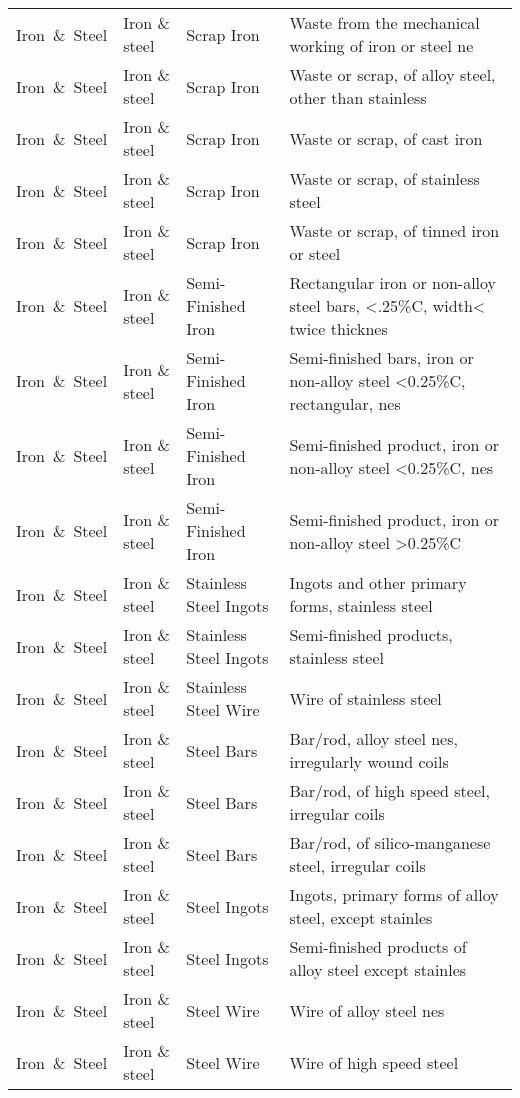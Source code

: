 \begin{appendices}
\begin{xltabular}{\textwidth}{|p{0.07\textwidth}|p{0.12\textwidth}|p{0.20\textwidth}|p{0.5\textwidth}|}
Iron\ \&\ Steel & Iron \& steel & Scrap Iron & Waste from the mechanical working of iron or steel ne \\
Iron\ \&\ Steel & Iron \& steel & Scrap Iron & Waste or scrap, of alloy steel, other than stainless \\
Iron\ \&\ Steel & Iron \& steel & Scrap Iron & Waste or scrap, of cast iron \\
Iron\ \&\ Steel & Iron \& steel & Scrap Iron & Waste or scrap, of stainless steel \\
Iron\ \&\ Steel & Iron \& steel & Scrap Iron & Waste or scrap, of tinned iron or steel \\
Iron\ \&\ Steel & Iron \& steel & Semi-Finished Iron & Rectangular iron or non-alloy steel bars, <.25\%C, width< twice thicknes \\
Iron\ \&\ Steel & Iron \& steel & Semi-Finished Iron & Semi-finished bars, iron or non-alloy steel <0.25\%C, rectangular, nes \\
Iron\ \&\ Steel & Iron \& steel & Semi-Finished Iron & Semi-finished product, iron or non-alloy steel <0.25\%C, nes \\
Iron\ \&\ Steel & Iron \& steel & Semi-Finished Iron & Semi-finished product, iron or non-alloy steel >0.25\%C \\
Iron\ \&\ Steel & Iron \& steel & Stainless Steel Ingots & Ingots and other primary forms, stainless steel \\
Iron\ \&\ Steel & Iron \& steel & Stainless Steel Ingots & Semi-finished products, stainless steel \\
Iron\ \&\ Steel & Iron \& steel & Stainless Steel Wire & Wire of stainless steel \\
Iron\ \&\ Steel & Iron \& steel & Steel Bars & Bar/rod, alloy steel nes, irregularly wound coils \\
Iron\ \&\ Steel & Iron \& steel & Steel Bars & Bar/rod, of high speed steel, irregular coils \\
Iron\ \&\ Steel & Iron \& steel & Steel Bars & Bar/rod, of silico-manganese steel, irregular coils \\
Iron\ \&\ Steel & Iron \& steel & Steel Ingots & Ingots, primary forms of alloy steel, except stainles \\
Iron\ \&\ Steel & Iron \& steel & Steel Ingots & Semi-finished products of alloy steel except stainles \\
Iron\ \&\ Steel & Iron \& steel & Steel Wire & Wire of alloy steel nes \\
Iron\ \&\ Steel & Iron \& steel & Steel Wire & Wire of high speed steel \\

\end{xltabular}
\end{appendices}
